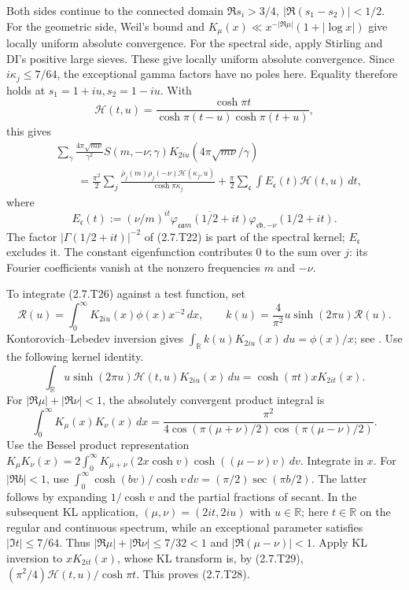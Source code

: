Both sides continue to the connected domain
$\Re s_i>3/4,\ |\Re(s_1-s_2)|<1/2$. For the geometric side,
Weil's bound and $K_\mu(x)\ll x^{-|\Re\mu|}(1+|\log x|)$
give locally uniform absolute convergence. For the spectral side, apply Stirling and DI's positive large sieves. These give locally uniform absolute convergence. Since $i\kappa_j\le7/64$, the exceptional gamma factors have no poles here. Equality therefore
holds at $s_1=1+iu,s_2=1-iu$. With
\[
\mathcal H(t,u)=\frac{\cosh\pi t}
                 {\cosh\pi(t-u)\cosh\pi(t+u)},
\tag{2.7.T25}\label{p1:eq:2.7.T25}
\]
this gives
\[
\begin{aligned}
&\sum_\gamma\frac{4\pi\sqrt{m\nu}}{\gamma^2}
 S(m,-\nu;\gamma)K_{2iu}(4\pi\sqrt{m\nu}/\gamma)\\
&\qquad=\frac{\pi^2}2\sum_j\frac{\bar\rho_j(m)\rho_j(-\nu)\mathcal H(\kappa_j,u)}
                      {\cosh\pi\kappa_j}
 +\frac\pi2\sum_{\mathfrak c}\int E_{\mathfrak c}(t)\mathcal H(t,u)\,dt,
\end{aligned}
\tag{2.7.T26}\label{p1:eq:2.7.T26}
\]
where
\[
 E_{\mathfrak c}(t)
 :=(\nu/m)^{it}
   \overline{\varphi_{\mathfrak c\mathfrak a m}(1/2+it)}
   \varphi_{\mathfrak c\mathfrak b,-\nu}(1/2+it).
\]
The factor $|\Gamma(1/2+it)|^{-2}$ of (2.7.T22) is part of the
spectral kernel; $E_{\mathfrak c}$ excludes it.
The constant eigenfunction contributes $0$ to the sum over $j$: its
Fourier coefficients vanish at the nonzero frequencies $m$ and $-\nu$.

To integrate (2.7.T26) against a test function, set
\[
\mathcal R(u)=\int_0^\infty K_{2iu}(x)\phi(x)x^{-2}\,dx,\qquad
k(u)=\frac4{\pi^2}u\sinh(2\pi u)\mathcal R(u).
\tag{2.7.T27}\label{p1:eq:2.7.T27}
\]
Kontorovich--Lebedev inversion gives
$\int_\mathbb R k(u)K_{2iu}(x)\,du=\phi(x)/x$;
see \cite[\S10.43(v), (10.43.30)--(10.43.31)]{DLMF}.
Use the following kernel identity.
\[
\int_\mathbb R u\sinh(2\pi u)\mathcal H(t,u)K_{2iu}(x)\,du
       =\cosh(\pi t)xK_{2it}(x).
\tag{2.7.T28}\label{p1:eq:2.7.T28}
\]
For $|\Re\mu|+|\Re\nu|<1$, the absolutely convergent product integral is
\[
\int_0^\infty K_\mu(x)K_\nu(x)\,dx
 =\frac{\pi^2}
 {4\cos(\pi(\mu+\nu)/2)\cos(\pi(\mu-\nu)/2)}.
\tag{2.7.T29}\label{p1:eq:2.7.T29}
\]
Use the Bessel product representation
$K_\mu K_\nu(x)=2\int_0^\infty K_{\mu+\nu}(2x\cosh v)
\cosh((\mu-\nu)v)\,dv$. Integrate in $x$. For $|\Re b|<1$, use
$\int_0^\infty\cosh(bv)/\cosh v\,dv=(\pi/2)\sec(\pi b/2)$.
The latter follows by expanding $1/\cosh v$ and the partial
fractions of secant. In the subsequent KL application,
$(\mu,\nu)=(2it,2iu)$ with $u\in\mathbb R$; here $t\in\mathbb R$ on
the regular and continuous spectrum, while an exceptional parameter
satisfies $|\Im t|\le 7/64$. Thus $|\Re\mu|+|\Re\nu|\le 7/32<1$ and
$|\Re(\mu-\nu)|<1$. Apply KL inversion to
$xK_{2it}(x)$, whose KL transform is, by (2.7.T29),
$(\pi^2/4)\mathcal H(t,u)/\cosh\pi t$. This proves (2.7.T28).

